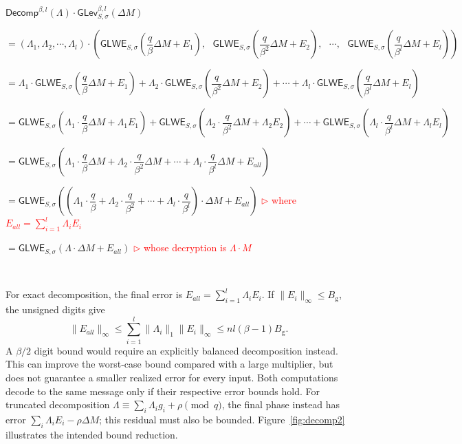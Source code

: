$\textsf{Decomp}^{\beta, l}(\Lambda) \cdot \textsf{GLev}_{S, \sigma}^{\beta, l}(\Delta M)$

$= (\Lambda_1, \Lambda_2, \cdots, \Lambda_l) \cdot \left (\textsf{GLWE}_{S, \sigma}\left(\dfrac{q}{\beta} \Delta M + E_1\right), \text{ } \textsf{GLWE}_{S, \sigma}\left(\dfrac{q}{\beta^2} \Delta M + E_2\right), \text{ } \cdots, \text{ } \textsf{GLWE}_{S, \sigma}\left(\dfrac{q}{\beta^l} \Delta M + E_l\right) \right )$

$= \Lambda_1\cdot\textsf{GLWE}_{S, \sigma}\left(\dfrac{q}{\beta} \Delta M + E_1\right) +  \Lambda_2\cdot\textsf{GLWE}_{S, \sigma}\left(\dfrac{q}{\beta^2} \Delta M + E_2\right) + \cdots + \Lambda_l\cdot\textsf{GLWE}_{S, \sigma}\left(\dfrac{q}{\beta^l} \Delta M + E_l\right)$

$= \textsf{GLWE}_{S, \sigma}\left(\Lambda_1\cdot\dfrac{q}{\beta}\Delta M + \Lambda_1 E_1\right) +\textsf{GLWE}_{S, \sigma}\left(\Lambda_2\cdot\dfrac{q}{\beta^2}\Delta M + \Lambda_2 E_2\right)+ \cdots + \textsf{GLWE}_{S, \sigma}\left(\Lambda_l\cdot\dfrac{q}{\beta^l}\Delta M + \Lambda_l E_l\right)$

$= \textsf{GLWE}_{S, \sigma}\left(\Lambda_1\cdot\dfrac{q}{\beta} \Delta M + \Lambda_2\cdot\dfrac{q}{\beta^2} \Delta M + \cdots + \Lambda_l\cdot\dfrac{q}{\beta^l} \Delta M+E_{\textit{all}}\right)$

$= \textsf{GLWE}_{S, \sigma}\left(\left(\Lambda_1\cdot\dfrac{q}{\beta} + \Lambda_2\cdot\dfrac{q}{\beta^2} + \cdots + \Lambda_l\cdot\dfrac{q}{\beta^l}\right)\cdot \Delta M  + E_{\textit{all}} \right)$ \textcolor{red}{ $\rhd$ where $E_{\textit{all}} = \sum\limits_{i=1}^l \Lambda_iE_i$}

$= \textsf{GLWE}_{S, \sigma}\left(\Lambda \cdot \Delta M + E_{\textit{all}}\right)$ \textcolor{red}{ $\rhd$ whose decryption is $\Lambda\cdot M$}

$ $

For exact decomposition, the final error is $E_{\textit{all}}=\sum_{i=1}^l\Lambda_iE_i$. If $\|E_i\|_\infty\le B_{\mathrm{g}}$, the unsigned digits give
\[
\|E_{\textit{all}}\|_\infty\le\sum_{i=1}^l\|\Lambda_i\|_1\|E_i\|_\infty\le nl(\beta-1)B_{\mathrm{g}}.
\]
A $\beta/2$ digit bound would require an explicitly balanced decomposition instead. This can improve the worst-case bound compared with a large multiplier, but does not guarantee a smaller realized error for every input. Both computations decode to the same message only if their respective error bounds hold. For truncated decomposition $\Lambda\equiv\sum_i\Lambda_i g_i+\rho\pmod q$, the final phase instead has error $\sum_i\Lambda_iE_i-\rho\Delta M$; this residual must also be bounded. Figure~\ref{fig:decomp2} illustrates the intended bound reduction.

